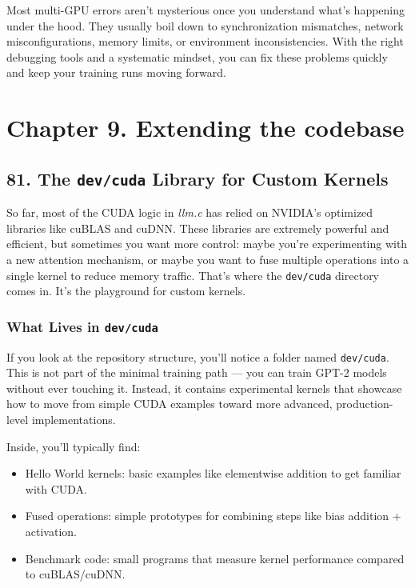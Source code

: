 \documentclass[
  letterpaper,
  DIV=11,
  numbers=noendperiod]{scrreprt}
\providecommand{\tightlist}{%
  \setlength{\itemsep}{0pt}\setlength{\parskip}{0pt}}
\begin{document}
Most multi-GPU errors aren't mysterious once you understand what's
happening under the hood. They usually boil down to synchronization
mismatches, network misconfigurations, memory limits, or environment
inconsistencies. With the right debugging tools and a systematic
mindset, you can fix these problems quickly and keep your training runs
moving forward.

\section{Chapter 9. Extending the
codebase}\label{chapter-9.-extending-the-codebase}

\subsection{\texorpdfstring{81. The \texttt{dev/cuda} Library for Custom
Kernels}{81. The dev/cuda Library for Custom Kernels}}\label{the-devcuda-library-for-custom-kernels}

So far, most of the CUDA logic in \emph{llm.c} has relied on NVIDIA's
optimized libraries like cuBLAS and cuDNN. These libraries are extremely
powerful and efficient, but sometimes you want more control: maybe
you're experimenting with a new attention mechanism, or maybe you want
to fuse multiple operations into a single kernel to reduce memory
traffic. That's where the \texttt{dev/cuda} directory comes in. It's the
playground for custom kernels.

\subsubsection{\texorpdfstring{What Lives in
\texttt{dev/cuda}}{What Lives in dev/cuda}}\label{what-lives-in-devcuda}

If you look at the repository structure, you'll notice a folder named
\texttt{dev/cuda}. This is not part of the minimal training path --- you
can train GPT-2 models without ever touching it. Instead, it contains
experimental kernels that showcase how to move from simple CUDA examples
toward more advanced, production-level implementations.

Inside, you'll typically find:

\begin{itemize}
\tightlist
\item
  Hello World kernels: basic examples like elementwise addition to get
  familiar with CUDA.
\item
  Fused operations: simple prototypes for combining steps like bias
  addition + activation.
\item
  Benchmark code: small programs that measure kernel performance
  compared to cuBLAS/cuDNN.
\end{itemize}
\end{document}
